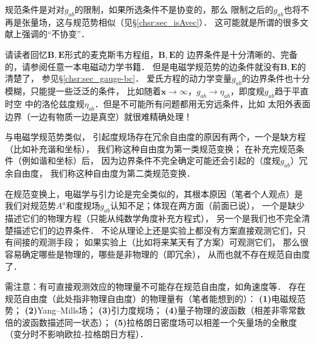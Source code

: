 

规范条件是对对$g_{ab}$的限制，如果所选条件不是协变的，那么
限制之后的$g_{ab}$也将不再是张量场，这与规范势相似（见\S\ref{chsr:sec_isAvec}）．
这可能就是所谓的很多文献上强调的“不协变”．

请读者回忆$\boldsymbol{B},\boldsymbol{E}$形式的麦克斯韦方程组，$\boldsymbol{B},\boldsymbol{E}$的
边界条件是十分清晰的、完备的，请参阅任意一本电磁动力学书籍．
但是电磁学规范势的边条件就没有$\boldsymbol{B},\boldsymbol{E}$的清楚了，
参见\S\ref{chsr:sec_gauge-bc}．
爱氏方程的动力学变量$g_{ab}$的边界条件也十分模糊，只能提一些泛泛的条件，
比如随着$\boldsymbol{x}\to \infty$，$g_{ab}\to \eta_{ab}$，即度规$g_{ab}$趋于平直时空
中的洛伦兹度规$\eta_{ab}$．但是不可能所有问题都用无穷远条件，比如
太阳外表面边界（一边有物质一边是真空）就很难精确处理！

与电磁学规范势类似，
引起度规场存在冗余自由度的原因有两个，一个是缺方程（比如补充谐和坐标），
我们称这种自由度为{\heiti 第一类规范变换}；
在补充完规范条件（例如谐和坐标）后，
因为边界条件不完全确定可能还会引起的（度规$g_{ab}$）冗余自由度，
我们称这种自由度为{\heiti 第二类规范变换}．

在规范变换上，电磁学与引力论是完全类似的，其根本原因（笔者个人观点）是
我们对规范势$A^a$和度规场$g_{ab}$认知不足；体现在两方面（前面已说），
一个是缺少描述它们的物理方程（只能从纯数学角度补充方程式），
另一个是我们也不完全清楚描述它们的边界条件．
不论从理论上还是实验上都没有方案直接观测它们，只有间接的观测手段；
如果实验上（比如将来某天有了方案）可观测它们，
那么很容易确定哪些是物理的，哪些是非物理的（即冗余），
从而也就不存在规范自由度了．

需注意：有可直接观测效应的物理量不可能存在规范自由度，如角速度等．
存在规范自由度（此处指非物理自由度）的物理量有（笔者能想到的）：
{\bfseries (1)}电磁规范势；
{\bfseries (2)}Yang--Mills场；
{\bfseries (3)}引力度规场；
{\bfseries (4)}量子物理的波函数（相差非零常数倍的波函数描述同一状态）；
{\bfseries (5)}拉格朗日密度场可以相差一个矢量场的全散度（变分时不影响欧拉-拉格朗日方程）．







